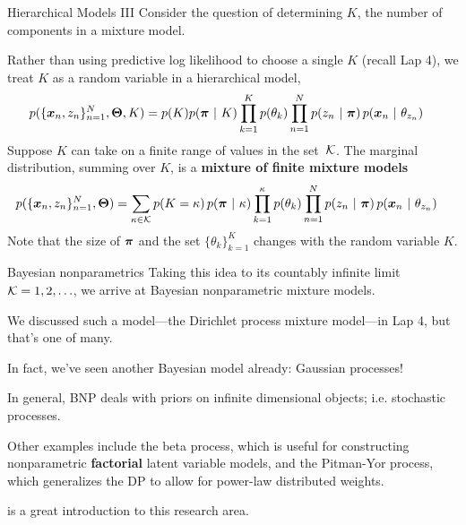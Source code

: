 \documentclass[aspectratio=169]{beamer}
\begin{document}
\begin{frame}{Hierarchical Models III}
    Consider the question of determining $K$, the number of components in a mixture model.
    
    Rather than using predictive log likelihood to choose a single $K$ (recall Lap 4), we treat $K$ as a random variable in a hierarchical model,
    \begin{align}
        p(\{\boldsymbol{x}_n, z_n\}_{n=1}^N, \boldsymbol{\Theta}, K) &= 
        p(K) p(\boldsymbol{\pi} ~\vert~ K) \prod_{k=1}^K p(\theta_{k}) \prod_{n=1}^N p(z_n ~\vert~ \boldsymbol{\pi}) \, p(\boldsymbol{x}_n ~\vert~ \theta_{z_n})
    \end{align}
    Suppose $K$ can take on a finite range of values in the set~$\mathcal{K}$. The marginal distribution, summing over $K$, is a \textbf{mixture of finite mixture models}~\citep{Miller2018-dv}
    \begin{align}
        p(\{\boldsymbol{x}_n, z_n\}_{n=1}^N, \boldsymbol{\Theta}) &= 
        \sum_{\kappa \in \mathcal{K}} p(K=\kappa) \, p(\boldsymbol{\pi} ~\vert~ \kappa) \prod_{k=1}^\kappa p(\theta_{k}) \prod_{n=1}^N p(z_n ~\vert~ \boldsymbol{\pi}) \, p(\boldsymbol{x}_n ~\vert~ \theta_{z_n})
    \end{align}
    Note that the size of $\boldsymbol{\pi}$ and the set $\{\theta_k\}_{k=1}^K$ changes with the random variable $K$. 
\end{frame}

\begin{frame}{Bayesian nonparametrics}
Taking this idea to its countably infinite limit $\mathcal{K} = 1, 2, \ldots$, we arrive at Bayesian nonparametric mixture models. 

We discussed such a model---the Dirichlet process mixture model---in Lap 4, but that's one of many.

In fact, we've seen another Bayesian model already: Gaussian processes!

In general, BNP deals with priors on infinite dimensional objects; i.e. stochastic processes. 

Other examples include the beta process, which is useful for constructing nonparametric \textbf{factorial} latent variable models, and the Pitman-Yor process, which generalizes the DP to allow for power-law distributed weights.

\citet{orbanz2012lecture} is a great introduction to this research area. 

\end{frame}
\end{document}
